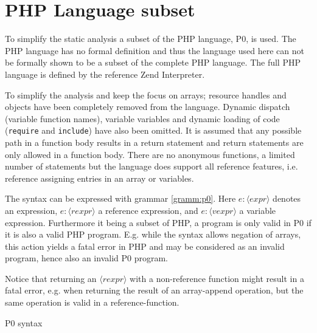 \section{PHP Language subset}
\newcommand{\syn}[1]{\langle#1\rangle}
\label{sec:langsubset}
To simplify the static analysis a subset of the PHP language, P0, is used. The PHP language has no formal definition and thus the language used here can not be formally shown to be a subset of the complete PHP language. The full PHP language is defined by the reference Zend Interpreter.

To simplify the analysis and keep the focus on arrays; resource handles and objects have been completely removed from the language. Dynamic dispatch (variable function names), variable variables and dynamic loading of code (\texttt{require} and \texttt{include}) have also been omitted. It is assumed that any possible path in a function body results in a return statement and return statements are only allowed in a function body. There are no anonymous functions, a limited number of statements but the language does support all reference features, i.e. reference assigning entries in an array or variables.

The syntax can be expressed with grammar \ref{gramm:p0}. Here $e : \syn{expr}$ denotes an expression, $e : \syn{rexpr}$ a reference expression, and $e : \syn{vexpr}$ a variable expression.   Furthermore it being a subset of PHP, a program is only valid in P0  if it is also a valid PHP program. E.g. while the syntax allows negation of arrays, this action yields a fatal error in PHP and may be considered as an invalid program, hence also an invalid P0 program. 

Notice that returning an $\syn{rexpr}$ with a non-reference function might result in a fatal error, e.g. when returning the result of an array-append operation, but the same operation is valid in a reference-function.  





\begin{grammarf}
\centering

\caption{P0 syntax }
\label{gramm:p0}
\end{grammarf}